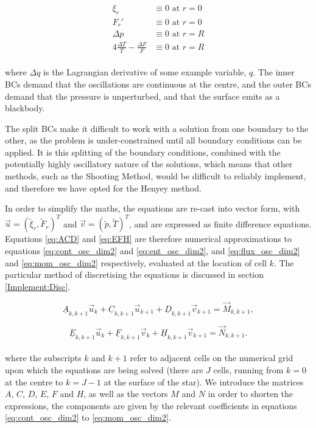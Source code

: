 \documentclass[11pt]{amsart}
\begin{document}
\begin{align}
\xi_{r} &\equiv 0 \text{ at } r = 0 \\
F_{r}' &\equiv 0 \text{ at } r = 0 \\
\Delta p &\equiv  0 \text{ at } r = R \\
4 \frac{\Delta T}{T} - \frac{\Delta F}{F} &\equiv  0 \text{ at } r = R
\end{align}
\\

where $\Delta q$ is the Lagrangian derivative of some example variable, $q$.  The inner BCs demand that the oscillations are continuous at the centre, and the outer BCs demand that the pressure is unperturbed, and that the surface emits as a blackbody.

The split BCs make it difficult to work with a solution from one boundary to the other, as the problem is under-constrained until all boundary conditions can be applied.  It is this splitting of the boundary conditions, combined with the potentially highly oscillatory nature of the solutions, which means that other methods, such as the Shooting Method, would be difficult to reliably implement, and therefore we have opted for the Henyey method.

In order to simplify the maths, the equations are re-cast into vector form, with $\vec{u} = \left( \tilde{\xi}_{r}, \tilde{F}_{r} \right)^{T}$ and $\vec{v} = \left( \tilde{p}, \tilde{T} \right)^{T}$, and are expressed as finite difference equations.  Equations \ref{eq:ACD} and \ref{eq:EFH} are therefore numerical approximations to equations \ref{eq:cont_osc_dim2} and \ref{eq:ent_osc_dim2}, and \ref{eq:flux_osc_dim2} and \ref{eq:mom_osc_dim2} respectively, evaluated at the location of cell $k$.  The particular method of discretising the equations is discussed in section \ref{Implement:Disc}.  


\begin{equation} \label{eq:ACD}
\underline{A}_{k,k+1} \vec{u}_{k} + \underline{C}_{k,k+1} \vec{u}_{k+1} + \underline{D}_{k,k+1} \vec{v}_{k+1} = \vec{M}_{k,k+1},
\end{equation} 

\begin{equation} \label{eq:EFH}
\underline{E}_{k,k+1} \vec{u}_{k} + \underline{F}_{k,k+1} \vec{v}_{k} + \underline{H}_{k,k+1} \vec{v}_{k+1} = \vec{N}_{k,k+1}.
\end{equation} 
\\

where the subscripts $k$ and $k+1$ refer to adjacent cells on the numerical grid upon which the equations are being solved (there are $J$ cells, running from $k = 0$ at the centre to $k = J - 1$ at the surface of the star).  We introduce the matrices $A$, $C$, $D$, $E$, $F$ and $H$, as well as the vectors $M$ and $N$ in order to shorten the expressions, the components are given by the relevant coefficients in equations \ref{eq:cont_osc_dim2} to \ref{eq:mom_osc_dim2}.
\end{document}
